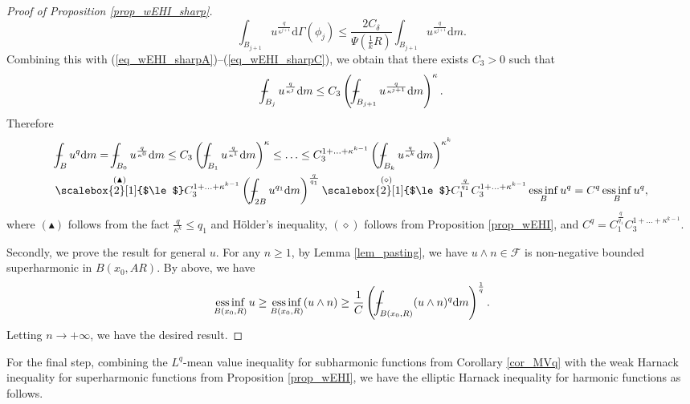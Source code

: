 \documentclass[11pt,a4paper]{article}
\numberwithin{equation}{section}
\newcommand{\einf}{\operatorname*{ess\,inf}}
\def\Xint#1{\mathchoice
{\XXint\displaystyle\textstyle{#1}}%
{\XXint\textstyle\scriptstyle{#1}}%
{\XXint\scriptstyle\scriptscriptstyle{#1}}%
{\XXint\scriptscriptstyle\scriptscriptstyle{#1}}%
\!\int}
\def\XXint#1#2#3{{\setbox0=\hbox{$#1{#2#3}{\int}$ }
\vcenter{\hbox{$#2#3$ }}\kern-.6\wd0}}
\def\dashint{\Xint-}
\theoremstyle{plain}
\theoremstyle{definition}
\begin{document}
\begin{proof}[Proof of Proposition \ref{prop_wEHI_sharp}]
$$\int_{B_{j+1}}u^{\frac{q}{\kappa^{j+1}}}\mathrm{d}\Gamma(\phi_j)\le \frac{2C_\delta}{\Psi(\frac{1}{k}R)}\int_{B_{j+1}}u^{\frac{q}{\kappa^{j+1}}} \mathrm{d}m.$$
Combining this with (\ref{eq_wEHI_sharpA})--(\ref{eq_wEHI_sharpC}), we obtain that there exists $C_3>0$ such that
$$\dashint_{B_j}u^{\frac{q}{\kappa^j}}\mathrm{d}m\le C_3 \left(\dashint_{B_{j+1}}u^{\frac{q}{\kappa^{j+1}}}\mathrm{d}m\right)^\kappa.$$
Therefore
\begin{align*}
&\dashint_{B}u^q \mathrm{d}m=\dashint_{B_0}u^{\frac{q}{\kappa^0}} \mathrm{d}m\le C_3\left(\dashint_{B_{1}}u^{\frac{q}{\kappa^{1}}}\mathrm{d}m\right)^\kappa\le\ldots\le C_3^{1+\ldots+\kappa^{k-1}}\left(\dashint_{B_{k}}u^{\frac{q}{\kappa^{k}}}\mathrm{d}m\right)^{\kappa^k}\\
&\overset{(\blacktriangle)}{\scalebox{2}[1]{$\le$}}C_3^{1+\ldots+\kappa^{k-1}} \left(\dashint_{2B}u^{q_1}\mathrm{d}m\right)^{\frac{q}{q_1}}\overset{(\diamond)}{\scalebox{2}[1]{$\le$}} C_1^{\frac{q}{q_1}}C_3^{1+\ldots+\kappa^{k-1}}\einf_{B}u^q=C^q\einf_{B}u^q,
\end{align*}
where $(\blacktriangle)$ follows from the fact $\frac{q}{\kappa^k}\le q_1$ and H\"older's inequality, $(\diamond)$ follows from Proposition \ref{prop_wEHI}, and $C^q=C_1^{\frac{q}{q_1}}C_3^{1+\ldots+\kappa^{k-1}}$.

Secondly, we prove the result for general $u$. For any $n\ge1$, by Lemma \ref{lem_pasting}, we have $u\wedge n\in \mathcal{F}$ is non-negative bounded superharmonic in $B(x_0,AR)$. By above, we have
$$\einf_{B(x_0,R)}u\ge\einf_{B(x_0,R)}(u\wedge n)\ge\frac{1}{C}\left(\dashint_{B(x_0,R)}(u\wedge n)^q \mathrm{d}m\right)^{\frac{1}{q}}.$$
Letting $n\to+\infty$, we have the desired result.
\end{proof}

For the final step, combining the $L^q$-mean value inequality for subharmonic functions from Corollary \ref{cor_MVq} with the weak Harnack inequality for superharmonic functions from Proposition \ref{prop_wEHI}, we have the elliptic Harnack inequality for harmonic functions as follows.
\end{document}
